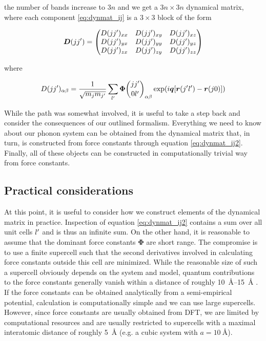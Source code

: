 \noindent the number of bands increase to $3n$ and we get a $3n \times 3n$ dynamical matrix, where each component \eqref{eq:dynmat_ij} is a $3 \times 3$ block of the form

\[
\bm{D}(jj^\prime) = \begin{pmatrix}
D(jj^\prime)_{xx} & D(jj^\prime)_{xy} & D(jj^\prime)_{xz} \\
D(jj^\prime)_{yx} & D(jj^\prime)_{yy} & D(jj^\prime)_{yz} \\
D(jj^\prime)_{zx} & D(jj^\prime)_{zy} & D(jj^\prime)_{zz}
\end{pmatrix}
\]

\noindent where

\begin{equation}
D(j\jp)_{\alpha\beta} = \frac{1}{\sqrt{m_j m_{\jp}}} \sum_{\lp} \fczero _{\alpha\beta} \exp (i\bm{q}[\bm{r}(\jp\lp) - \bm{r}(j0)]) \label{eq:dynmat_ij2}
\end{equation}

\noindent While the path was somewhat involved, it is useful to take a step back and consider the consequences of our outlined formalism. Everything we need to know about our phonon system can be obtained from the dynamical matrix that, in turn,  is constructed from force constants through equation \eqref{eq:dynmat_ij2}. Finally, all of these objects can be constructed in computationally trivial way from force constants.

\subsection{Practical considerations}\label{sec:phononpractical}
At this point, it is useful to consider how we construct elements of the dynamical matrix in practice. Inspection of equation \eqref{eq:dynmat_ij2} contains a sum over all unit cells $l^\prime$ and is thus an infinite sum. On the other hand, it is reasonable to assume that the dominant force constants $\bm{\Phi}$ are short range. The compromise is to use a finite supercell such that the second derivatives involved in calculating force constants outside this cell are minimized. While the reasonable size of such a supercell obviously depends on the system and model, quantum contributions to the force constants generally vanish within a distance of roughly \SIrange{10}{15}{\angstrom} . If the force constants can be obtained analytically from a semi-empirical potential, calculation is computationally simple and we can use large supercells. However, since force constants are usually obtained from DFT, we are limited by computational resources and are usually restricted to supercells with a maximal interatomic distance of roughly \SI{5}{\angstrom} (e.g. a cubic system with $a=\SI{10}{\angstrom}$).

